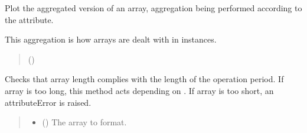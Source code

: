 \documentclass[letterpaper,10pt,english]{sphinxmanual}
\begin{document}
\begin{fulllineitems}
\begin{fulllineitems}
\begin{quote}
\begin{description}
\end{description}\end{quote}

\end{fulllineitems}


\begin{fulllineitems}
\label{\detokenize{generated/tamos.TimeSettings:tamos.TimeSettings.plot_array_aggregation}}
\pysigstartsignatures
{}
\pysigstopsignatures
\sphinxAtStartPar
Plot the aggregated version of an array, aggregation being performed  according to the  attribute.

\sphinxAtStartPar
This aggregation is how arrays are dealt with in  instances.
\begin{quote}\begin{description}
\sphinxAtStartPar
{} () \textendash{} 

\end{description}\end{quote}

\end{fulllineitems}


\begin{fulllineitems}
\label{\detokenize{generated/tamos.TimeSettings:tamos.TimeSettings.prepare_array}}
\pysigstartsignatures
{}
\pysigstopsignatures
\sphinxAtStartPar
Checks that array length complies with the length of the operation period.
If array is too long, this method acts depending on .
If array is too short, an attributeError is raised.
\begin{quote}\begin{description}
\begin{itemize}
\item {} 
\sphinxAtStartPar
{} () \textendash{} The array to format.


\end{itemize}
\end{description}
\end{quote}
\end{fulllineitems}
\end{fulllineitems}
\end{document}
